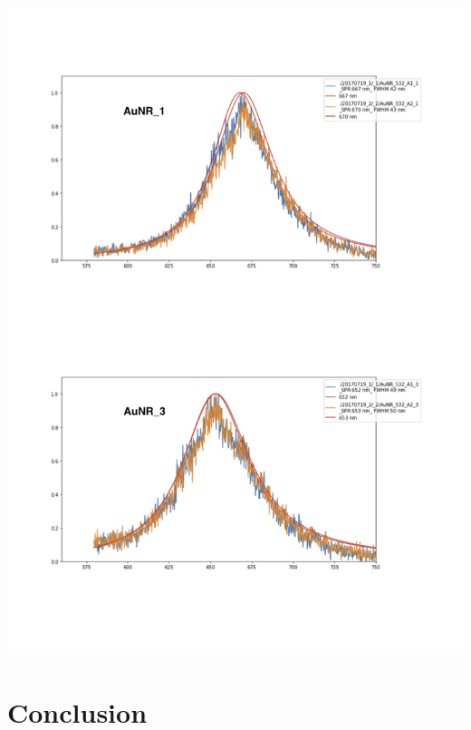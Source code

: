 \documentclass[twoside,single]{lion-msc}
\begin{document}
\begin{center}
\includegraphics[scale=.8]{8.png}
\end{center}
\section{Conclusion}

 


\end{document}
